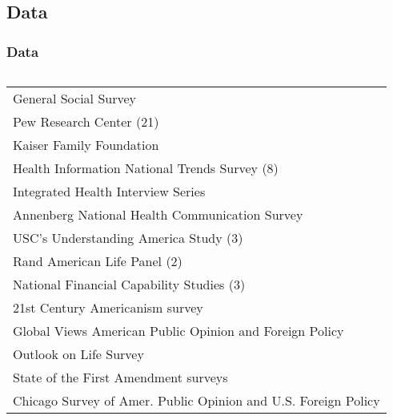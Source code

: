 \documentclass[pdf]{beamer}
\begin{document}
\subsection{Data}
\begin{frame}
\frametitle{Data}
  \begin{columns}
      \begin{tabular}{l}  %
        \hline   %
        General Social Survey           \\
        Pew Research Center (21)           \\
        Kaiser Family Foundation        \\
        Health Information National Trends Survey (8) \\
        Integrated Health Interview Series \\
        Annenberg National Health Communication Survey \\
        USC's Understanding America Study (3) \\
        Rand American Life Panel (2)  \\
        National Financial Capability Studies (3) \\
        21st Century Americanism survey \\
        Global Views American Public Opinion and Foreign Policy \\
        Outlook on Life Survey \\
        State of the First Amendment surveys \\
        Chicago Survey of Amer. Public Opinion and U.S. Foreign Policy \\
        \hline  %
        \end{tabular}
   \end{columns}

\end{frame}
\end{document}
